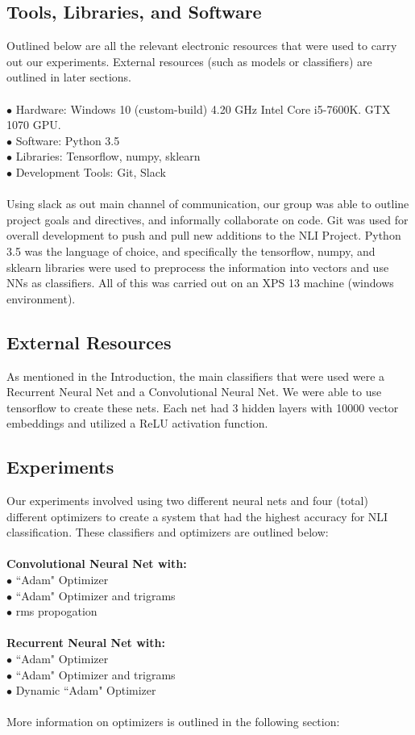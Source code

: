 \documentclass[11pt,a4paper]{article}
\newcommand\tab[1][1cm]{\hspace*{#1}}
\begin{document}
\subsection{Tools, Libraries, and Software}
Outlined below are all the relevant electronic resources that were used to carry out our experiments. External resources (such as models or classifiers) are outlined in later sections.\\
\\
$\bullet$ Hardware: Windows 10 (custom-build) 4.20 GHz Intel Core i5-7600K. GTX 1070 GPU.\\
$\bullet$ Software: Python 3.5\\
$\bullet$ Libraries: Tensorflow, numpy, sklearn\\
$\bullet$ Development Tools: Git, Slack\\
\\
Using slack as out main channel of communication, our group was able to outline project goals and directives, and informally collaborate on code. Git was used for overall development to push and pull new additions to the NLI Project. Python 3.5 was the language of choice, and specifically the tensorflow, numpy, and sklearn libraries were used to preprocess the information into vectors and use NNs as classifiers. All of this was carried out on an XPS 13 machine (windows environment).
\subsection{External Resources}
\tab As mentioned in the Introduction, the main classifiers that were used were a Recurrent Neural Net and a Convolutional Neural Net. We were able to use tensorflow to create these nets. Each net had 3 hidden layers with 10000 vector embeddings and utilized a ReLU activation function.
\subsection{Experiments}
\tab Our experiments involved using two different neural nets and four (total) different optimizers to create a system that had the highest accuracy for NLI classification. These classifiers and optimizers are outlined below:\\
\\
\textbf{Convolutional Neural Net with:}\\
\tab $\bullet$ ``Adam" Optimizer\\
\tab $\bullet$ ``Adam" Optimizer and trigrams\\
\tab $\bullet$ rms propogation\\
\\
\textbf{Recurrent Neural Net with:}\\
\tab $\bullet$ ``Adam" Optimizer\\
\tab $\bullet$ ``Adam" Optimizer and trigrams\\
\tab $\bullet$ Dynamic ``Adam" Optimizer\\
\\
More information on optimizers is outlined in the following section:
\end{document}
